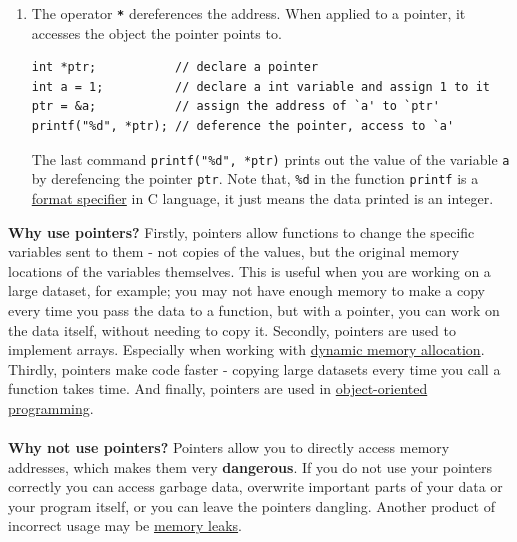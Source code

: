 \documentclass{article}
\begin{document}
\begin{appendices}
\begin{enumerate}
    \item The operator {\Large\textbf{\texttt{*}}} dereferences the address. When applied to a pointer, it accesses the object the pointer points to.
\begin{lstlisting} 
int *ptr;           // declare a pointer
int a = 1;          // declare a int variable and assign 1 to it
ptr = &a;           // assign the address of `a' to `ptr'
printf("%d", *ptr); // deference the pointer, access to `a'
\end{lstlisting} \vspace{-.7cm}
\noindent The last command \texttt{printf("\%d", *ptr)} prints out the value of the variable \texttt{a} by derefencing the pointer \texttt{ptr}. Note that, \texttt{\%d} in the function \texttt{printf} is a \href{https://www.geeksforgeeks.org/format-specifiers-in-c/}{format specifier} in C language, it just means the data printed is an integer.
\end{enumerate}

\noindent \textbf{Why use pointers?} Firstly, pointers allow functions to change the specific variables sent to them - not copies of the values, but the original memory locations of the variables themselves. This is useful when you are working on a large dataset, for example; you may not have enough memory to make a copy every time you pass the data to a function, but with a pointer, you can work on the data itself, without needing to copy it. Secondly, pointers are used to implement arrays. Especially when working with \href{https://en.wikipedia.org/wiki/C_dynamic_memory_allocation}{dynamic memory allocation}. Thirdly, pointers make code faster - copying large datasets every time you call a function takes time. And finally, pointers are  used in \href{https://en.wikipedia.org/wiki/Object-oriented_programming}{object-oriented programming}.\\\\
\noindent \textbf{Why not use pointers?} Pointers allow you to directly access memory addresses, which makes them very \textbf{dangerous}. If you do not use your pointers correctly you can access garbage data, overwrite important parts of your data or your program itself, or you can leave the pointers dangling. Another product of incorrect usage may be \href{https://en.wikipedia.org/wiki/Memory_leak}{memory leaks}.



\end{appendices}
\end{document}

